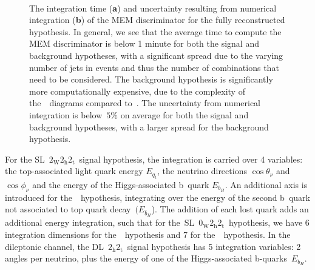 \begin{figure}
\begin{centering}
\\
\caption[The MEM integration time.]{The integration time (\textbf{a}) and uncertainty resulting from numerical integration (\textbf{b}) of the MEM discriminator for the fully reconstructed hypothesis. In general, we see that the average time to compute the MEM discriminator is below 1 minute for both the signal and background hypotheses, with a significant spread due to the varying number of jets in events and thus the number of combinations that need to be considered. The background hypothesis is significantly more computationally expensive, due to the complexity of the~\ttbb~diagrams compared to~\ttHbb. The uncertainty from numerical integration is below~$5\%$ on average for both the signal and background hypotheses, with a larger spread for the background hypothesis.}
\label{fig:mem_numerical_accuracy}
\end{centering}
\end{figure}

For the SL~$2_{\mathrm{W}} 2_{\mathrm{h}} 2_{\mathrm{t}}$~signal hypothesis, the integration is carried over 4 variables: the top-associated light quark energy $E_{q_t}$, the neutrino directions $\cos{\theta_\nu}$ and $\cos{\phi_\nu}$ and the energy of the Higgs-associated b~quark $E_{b_H}$. An additional axis is introduced for the~\ttbb~hypothesis, integrating over the energy of the second b~quark not associated to top quark decay~$(E_{\bar{b}_H}$). The addition of each lost quark adds an additional energy integration, such that for the~SL~$0_{\mathrm{W}} 2_{\mathrm{h}} 2_{\mathrm{t}}$~hypothesis, we have 6 integration dimensions for the~\ttHbb~hypothesis and 7 for the~\ttbb~hypothesis. In the dileptonic channel, the DL~$2_{\mathrm{h}} 2_{\mathrm{t}}$~signal hypothesis has 5 integration variables: 2 angles per neutrino, plus the energy of one of the Higgs-associated b-quarks~$E_{b_H}$.

